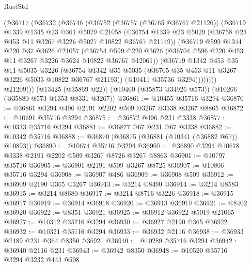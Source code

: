 \begin{lexlean}{RustStd}
\begin{coremodule}
          (@36717
            (@36732
              (@36746
                (@36752
                  (@36757 (@36765 @36767 @21126))
                  (@36719
                    @1339
                    @1345
                    @23
                    @361
                    @5029
                    @21058
                    (@36754
                      @1339
                      @23
                      @5029
                      (@36758 @23 @453 @11 @3267 @3226 @5027 @10822 @36767 @21149))
                    (@36719
                      @599
                      @1344
                      @220
                      @37
                      @3626
                      @21057
                      (@36754
                        @599
                        @220
                        @3626
                        (@36704 @596 @220 @453 @11 @3267 @3226 @3624 @10822 @36767 @12061))
                      (@36719
                        @1342
                        @453
                        @35
                        @11
                        @5035
                        @3226
                        (@36754
                          @1342
                          @35
                          @5035
                          (@36705 @35 @453 @11 @3267 @3226 @5033 @10822 @36767 @21193))
                        (@10411 @35736 @3294))))))))
          @21209)))
    (@13425 (@35869 @22))
    (@10400 (@35873 @34926 @573))
    (@10266 (@35880 @573 @1353 @8331 @3267))
@36861 := @10455 @35716 @3294
@36870 := @36861 @3294 @496 @2191 @2202 @509 @3267 @3338 @3267 @8865
@36872 := @10691 @35716 @3294
@36875 := @36872 @496 @231 @3338
@36877 := @10333 @35716 @3294
@36881 := @36877 @67 @231 @67 @3338
@36882 := @10342 @35716
@36888 := @36870 (@36875 (@36881 (@10341 (@36882 @67)) @10893))
@36890 := @10674 @35716 @3294
@36900 := @36890 @3294 @10678 @3338 @2191 @2202 @509 @3267 @8726 @3267 @8863
@36901 := @10797 @35716
@36905 := @36901 @2191 @509 @3267 @8725
@36907 := @10806 @35716 @3294
@36908 := @36907 @486
@36909 := @36908 @509
@36912 := @36909 @2190 @365 @3267
@36913 := @3214 @8490
@36914 := @3214 @8583
@36915 := @3214 @8680
@36917 := @3214 @8716 @3226
@36918 := @36915 @36917
@36919 := @36914 @36918
@36920 := @36913 @36919
@36921 := @8402 @36920
@36922 := @8351 @36921
@36925 := @36912 @36922 @5019 @21065
@36927 := @10312 @35716 @3294
@36930 := @36927 @2190 @365 @36922
@36932 := @10321 @35716 @3294
@36933 := @36932 @2116
@36938 := @36933 @2189 @231 @364 @8350 @36921
@36940 := @10289 @35716 @3294
@36942 := @36940 @2116 @231
@36943 := @36942 @8350
@36948 := @10520 @35716 @3294 @3232 @443 @508

\end{coremodule}
\end{lexlean}
